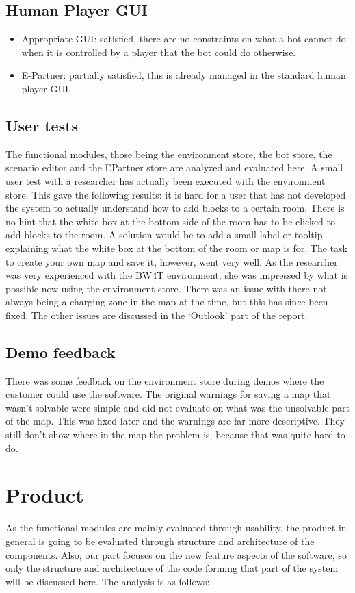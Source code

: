 \subsection*{Human Player GUI}
\begin{itemize}
	\item Appropriate GUI: satisfied, there are no constraints on what a bot cannot do when it is controlled by a player that the bot could do otherwise.
	\item E-Partner: partially satisfied, this is already managed in the standard human player GUI.
\end{itemize}

\subsection*{User tests}
The functional modules, those being the environment store, the bot store, the scenario editor and the EPartner store are analyzed and evaluated here. A small user test with a researcher has actually been executed with the environment store. This gave the following results: it is hard for a user that has not developed the system to actually understand how to add blocks to a certain room. There is no hint that the white box at the bottom side of the room has to be clicked to add blocks to the room. A solution would be to add a small label or tooltip explaining what the white box at the bottom of the room or map is for. The task to create your own map and save it, however, went very well. As the researcher was very experienced with the BW4T environment, she was impressed by what is possible now using the environment store. There was an issue with there not always being a charging zone in the map at the time, but this has since been fixed. The other issues are discussed in the `Outlook' part of the report.

\subsection*{Demo feedback}
There was some feedback on the environment store during demos where the customer could use the software. The original warnings for saving a map that wasn't solvable were simple and did not evaluate on what was the unsolvable part of the map. This was fixed later and the warnings are far more descriptive. They still don't show where in the map the problem is, because that was quite hard to do.

\section{Product}
As the functional modules are mainly evaluated through usability, the product in general is going to be evaluated through structure and architecture of the components. Also, our part focuses on the new feature aspects of the software, so only the structure and architecture of the code forming that part of the system will be discussed here. The analysis is as follows:

